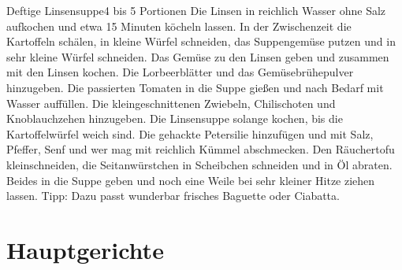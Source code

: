 \documentclass[a4paper,10pt]{article}
\begin{document}
    \newpage
       
    \begin{recipe}{Deftige Linsensuppe}{4 bis 5 Portionen}{}
        Die Linsen in reichlich Wasser ohne Salz aufkochen und etwa 15 Minuten köcheln lassen.
        In der Zwischenzeit die Kartoffeln schälen, in kleine Würfel schneiden, das Suppengemüse putzen 
        und in sehr kleine Würfel schneiden. Das Gemüse zu den Linsen geben und zusammen mit den Linsen kochen.
        Die Lorbeerblätter und das Gemüsebrühepulver hinzugeben. Die passierten Tomaten in die Suppe gießen
        und nach Bedarf mit Wasser auffüllen.
        Die kleingeschnittenen Zwiebeln, Chilischoten und Knoblauchzehen hinzugeben.
        Die Linsensuppe solange kochen, bis die Kartoffelwürfel weich sind. 
        Die gehackte Petersilie hinzufügen und mit Salz, Pfeffer, Senf und wer mag mit reichlich Kümmel abschmecken.
        Den Räuchertofu kleinschneiden, die Seitanwürstchen in Scheibchen schneiden und in Öl abraten. 
        Beides in die Suppe geben und noch eine Weile bei sehr kleiner Hitze ziehen lassen. 
        \freeform Tipp: Dazu passt wunderbar frisches Baguette oder Ciabatta.
    \end{recipe}
    
    \newpage
    
    
    \section{Hauptgerichte}
    
\end{document}
